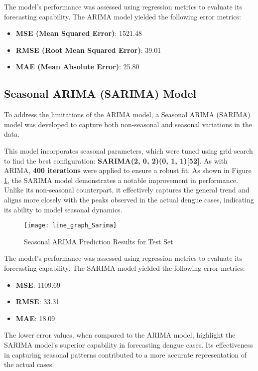 The model's performance was assessed using regression metrics to evaluate its forecasting capability. The ARIMA model yielded the following error metrics:

\begin{itemize}
	\item \textbf{MSE (Mean Squared Error)}: 1521.48
	\item \textbf{RMSE (Root Mean Squared Error)}: 39.01
	\item \textbf{MAE (Mean Absolute Error)}: 25.80
\end{itemize}

\subsection{Seasonal ARIMA (SARIMA) Model}

To address the limitations of the ARIMA model, a Seasonal ARIMA (SARIMA) model was developed to capture both non-seasonal and seasonal variations in the data.

This model incorporates seasonal parameters, which were tuned using grid search to find the best configuration: \textbf{SARIMA(2, 0, 2)(0, 1, 1)[52]}. As with ARIMA, \textbf{400 iterations} were applied to ensure a robust fit. As shown in Figure \ref{fig:Sarima_result}, the SARIMA model demonstrates a notable improvement in performance. Unlike its non-seasonal counterpart, it effectively captures the general trend and aligns more closely with the peaks observed in the actual dengue cases, indicating its ability to model seasonal dynamics.

\begin{figure}[H]
	\centering
	\texttt{[image: line\_graph\_Sarima]}
	\caption{Seasonal ARIMA Prediction Results for Test Set}
	\label{fig:Sarima_result}
\end{figure}

The model's performance was assessed using regression metrics to evaluate its forecasting capability. The SARIMA model yielded the following error metrics: \begin{itemize} \item \textbf{MSE}: 1109.69 \item \textbf{RMSE}: 33.31 \item \textbf{MAE}: 18.09 \end{itemize} The lower error values, when compared to the ARIMA model, highlight the SARIMA model's superior capability in forecasting dengue cases. Its effectiveness in capturing seasonal patterns contributed to a more accurate representation of the actual cases.

